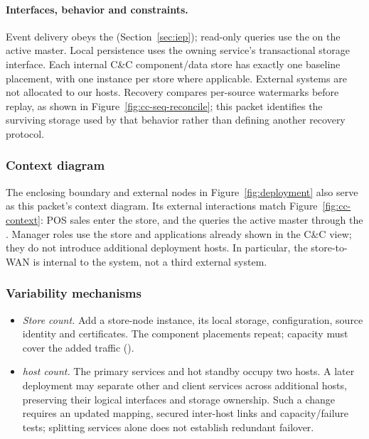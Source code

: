 \paragraph{Interfaces, behavior and constraints.}
Event delivery obeys the \IEP (Section~\ref{sec:iep}); read-only queries use the
\InventoryQuery on the active master. Local persistence
uses the owning service's transactional storage interface. Each internal C\&C
component/data store has exactly one baseline placement, with one instance per
store where applicable. External systems are not allocated to our hosts.
Recovery compares per-source watermarks before replay, as shown in
Figure~\ref{fig:cc-seq-reconcile}; this packet identifies the surviving storage
used by that behavior rather than defining another recovery protocol.

\subsubsection{Context diagram}
The enclosing boundary and external nodes in Figure~\ref{fig:deployment} also
serve as this packet's context diagram. Its external interactions match
Figure~\ref{fig:cc-context}: POS sales enter the store, and the \AnalyticsClient
queries the active master through the \InventoryQuery. Manager roles use the store and \DC applications
already shown in the C\&C view; they do not introduce additional deployment hosts.
In particular, the store-to-\DC WAN is internal to the system, not a third
external system.

\subsubsection{Variability mechanisms}
\begin{itemize}[nosep]
\item \emph{Store count.} Add a store-node instance, its local storage,
\StoreAgent configuration, source identity and certificates. The component
placements repeat; capacity must cover the added traffic ().
\item \emph{\DC host count.} The primary services and hot standby occupy two
hosts. A later deployment may separate other \CFE and client services across
additional hosts, preserving their logical interfaces and storage ownership. Such a change
requires an updated mapping, secured inter-host links and capacity/failure tests;
splitting services alone does not establish redundant failover.
\end{itemize}

